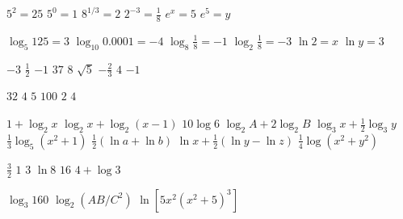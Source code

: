 \begin{Answer}[ref={exLogFunctions}]
\Question %
\begin{tasks}
	\task  $5^{2} =25$
	\task $5^{0} =1$
	\task $8^{1/3} =2$
	\task $2^{ -3} =\frac{1}{8}$ 
	\task $e^{x} =5$
	\task $e^{5} =y$ 
\end{tasks}

\Question %
\begin{tasks}
	\task  $\log _{5} 125 =3$
	\task  $\log _{10} 0.0001 = -4$
	\task $\log _{8} \frac{1}{8} = -1$
	\task $\log _{2} \frac{1}{8} = -3$
	\task $\ln  2 =x$
	\task $\ln  y =3$ 
\end{tasks}


\Question %
\begin{tasks}
	\task $ -3$
	\task $\frac{1}{2}$ 
	\task $ -1$ 
	\task $37$
	\task $8$
	\task $\sqrt{5}$
	\task $ -\frac{2}{3}$
	\task $4$
	\task $ -1$ 
\end{tasks}

\Question %
\begin{tasks}
	\task $32$
	\task $4$
	\task $5$
	\task $100$
	\task $2$
	\task $4$
\end{tasks}

\Question %
\begin{tasks}
	\task $1 +\log _{2} x$ 
	\task $\log _{2} x +\log _{2} \left (x -1\right )$ 
	\task $10 \log  6$
	\task $\log _{2} A +2 \log _{2} B$ 
	\task $\log _{3} x +\frac{1}{2} \log _{3} y$ 
	\task $\frac{1}{3} \log _{5} \left (x^{2} +1\right )$ 
	\task $\frac{1}{2} \left (\ln  a +\ln  b\right )$ 
	\task $\ln  x +\frac{1}{2} \left (\ln  y -\ln  z\right )$ 
	\task $\frac{1}{4} \log  \left (x^{2} +y^{2}\right )$ 
\end{tasks}

\Question %
\begin{tasks} 
	\task $\frac{3}{2}$
	\task $1$
	\task $3$ 
	\task $\ln  8$ 
	\task $16$
	\task $4 +\log  3$ 
\end{tasks}

\Question %
\begin{tasks}
	\task $\log _{3} 160$ 
	\task $\log _{2} \left (A B/C^{2}\right )$ 
	\task $\ln  \left [5 x^{2} \left (x^{2} +5\right )^{3}\right ]$ 
\end{tasks}


\end{Answer}%
